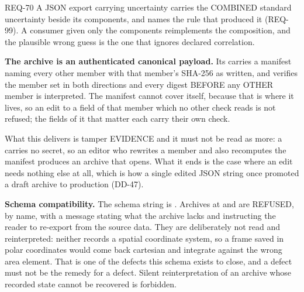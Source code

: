 \begin{reqbox}{REQ-70}{\stable}
A JSON export carrying uncertainty carries the COMBINED standard
uncertainty beside its components, and names the rule that produced it
(REQ-99). A consumer given only the components reimplements the
composition, and the plausible wrong guess is the one that ignores
declared correlation.

\textbf{The archive is an authenticated canonical payload.} Its
 carries a manifest naming every other member with
that member's SHA-256 as written, and  verifies the
member set in both directions and every digest BEFORE any OTHER member
is interpreted. The manifest cannot cover  itself,
because that is where it lives, so an edit to a field of that member
which no other check reads is not refused; the fields of it that matter
each carry their own check.

What this delivers is tamper EVIDENCE and it must not be read as more:
a  carries no secret, so an editor who rewrites a member and
also recomputes the manifest produces an archive that opens. What it
ends is the case where an edit needs nothing else at all, which is how
a single edited JSON string once promoted a draft archive to production
(DD-47).

\textbf{Schema compatibility.} The schema string is
. Archives at  and
 are REFUSED, by name, with a message stating what
the archive lacks and instructing the reader to re-export from the
source data. They are deliberately not read and reinterpreted: neither
records a spatial coordinate system, so a frame saved in polar
coordinates would come back cartesian and integrate against the wrong
area element. That is one of the defects this schema exists to close,
and a defect must not be the remedy for a defect. Silent
reinterpretation of an archive whose recorded state cannot be recovered
is forbidden.
\end{reqbox}

